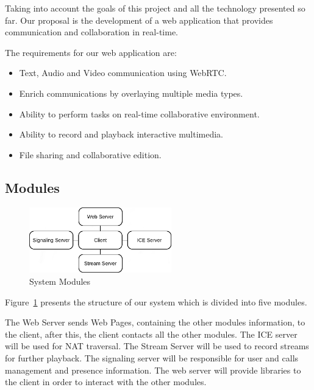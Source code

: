 Taking into account the goals of this project and all the technology presented so far. Our proposal is the development of a web application that provides communication and collaboration in real-time.

The requirements for our web application are:

\begin{itemize}
 \item Text, Audio and Video communication using \ac{WebRTC}.
 \item Enrich communications by overlaying multiple media types.
 \item Ability to perform tasks on real-time collaborative environment.
 \item Ability to record and playback interactive multimedia.
 \item File sharing and collaborative edition.
\end{itemize}

\subsection{Modules}

\begin{figure}[H]
	\centering
	\includegraphics[width=0.55\textwidth]{figures/archs.png}
	\caption{System Modules}
        \label{fig:modules}
\end{figure}
Figure~\ref{fig:modules} presents the structure of our system which is divided into five modules. 

 The Web Server sends Web Pages, containing the other modules information, to the client, after this, the client contacts all the other modules. The \ac{ICE} server will be used for \ac{NAT} traversal. The Stream Server will be used to record streams for further playback. The signaling server will be responsible for user and calls management and presence information. The web server will provide libraries to the client in order to interact with the other modules.

